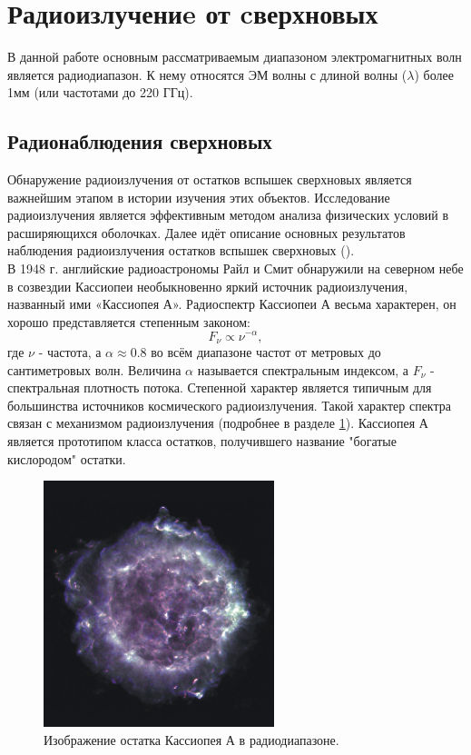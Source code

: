 \documentclass[a4paper,12pt]{extarticle}
\begin{document}
\section{Радиоизлучениe от cверхновых} \label{sec: Radio emission}
\hspace{1cm} В данной работе основным рассматриваемым диапазоном электромагнитных волн является радиодиапазон.
К нему относятся ЭМ волны с длиной волны ($\lambda$) более 1мм (или частотами до 220 ГГц).




\subsection{Радионаблюдения сверхновых}
Обнаружение радиоизлучения от остатков вспышек сверхновых является важнейшим этапом в истории изучения этих объектов. 
Исследование радиоизлучения является эффективным методом анализа физических условий в расширяющихся оболочках. 
Далее идёт описание основных результатов наблюдения радиоизлучения остатков вспышек сверхновых (\cite{Shklov1984}). \\
\indent В 1948 г. английские радиоастрономы Райл и Смит обнаружили на северном небе в созвездии Кассиопеи необыкновенно яркий источник радиоизлучения, названный ими «Кассиопея А». 
Радиоспектр Кассиопеи А весьма характерен, он хорошо представляется степенным законом:
$$ F_\nu \propto \nu^{-\alpha},$$
где $\nu$ - частота, а $\alpha \approx 0.8$ во всём диапазоне частот от метровых до сантиметровых волн. Величина $\alpha $ называется спектральным индексом, а $F_\nu$ - спектральная плотность потока. Степенной характер является типичным для большинства источников космического радиоизлучения. Такой характер спектра связан с механизмом радиоизлучения (подробнее в разделе \ref{sec: Radio emission}). 
Кассиопея А является прототипом класса остатков, получившего название "богатые кислородом" остатки. 

\begin{figure}[!htb] 
	\centering
	\includegraphics[width=0.6\textwidth]{CassA_2002_large-1_Radio.jpg}
	\caption{
		Изображение остатка Кассиопея А в радиодиапазоне.
	}
	\label{fig:Cas A Radio}
\end{figure}
\end{document}
